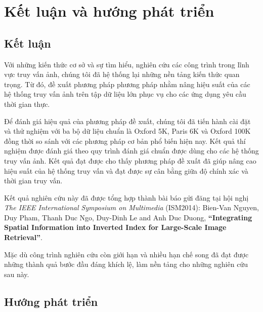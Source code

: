 \def\baselinestretch{1}
\chapter{Kết luận và hướng phát triển}
\label{chapter:summarize}
\ifpdf
    \graphicspath{{Conclusions/ConclusionsFigs/PNG/}{Conclusions/ConclusionsFigs/PDF/}{Conclusions/ConclusionsFigs/}}
\else
    \graphicspath{{Conclusions/ConclusionsFigs/EPS/}{Conclusions/ConclusionsFigs/}}
\fi

\section{Kết luận}
Với những kiến thức cơ sở và sự tìm hiểu, nghiên cứu các công trình trong lĩnh vực truy vấn ảnh, chúng tôi đã hệ thống lại những nền tảng kiến thức quan trọng. Từ đó, đề xuất phương pháp phương pháp nhằm nâng hiệu suất của các hệ thống truy vấn ảnh trên tập dữ liệu lớn phục vụ cho các ứng dụng yêu cầu thời gian thực.

Để đánh giá hiệu quả của phương pháp đề xuất, chúng tôi đã tiến hành cài đặt và thử nghiệm với ba bộ dữ liệu chuẩn là Oxford 5K, Paris 6K và Oxford 100K đồng thời so sánh với các phương pháp cơ bản phổ biến hiện nay. Kết quả thí nghiệm được đánh giá theo quy trình đánh giá chuẩn được dùng cho các hệ thống truy vấn ảnh. Kết quả đạt được cho thấy phương pháp đề xuất đã giúp nâng cao hiệu suất của hệ thống truy vấn và đạt được sự cân bằng giữa độ chính xác và thời gian truy vấn.

Kết quả nghiên cứu này đã được tổng hợp thành bài báo gửi đăng tại hội nghị \textit{The IEEE International Symposium on Multimedia} (ISM2014):  Bien-Van Nguyen, Duy Pham, Thanh Duc Ngo, Duy-Dinh Le and Anh Duc Duong, \textbf{``Integrating Spatial Information into Inverted Index for Large-Scale Image Retrieval''}.

Mặc dù công trình nghiên cứu còn giới hạn và nhiều hạn chế song đã đạt được những thành quả bước đầu đáng khích lệ, làm nền tảng cho những nghiên cứu sau này.

\section{Hướng phát triển}
